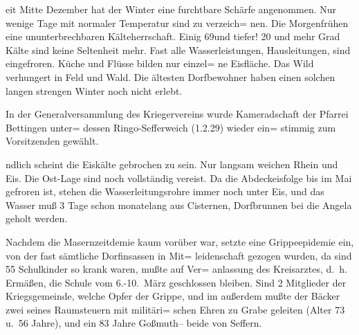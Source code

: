

%
eit Mitte Dezember hat der Winter eine\ob
furchtbare Schärfe angenommen. Nur wenige\ob
Tage mit normaler Temperatur sind zu verzeich=\ob
nen. Die Morgenfrühen eine ununterbrechbaren\ob
Kälteherrschaft. Einig 69\unsicher und tiefer! 20 und\ob
mehr Grad Kälte sind keine Seltenheit mehr.\ob
Fast alle Wasserleistungen, Hausleitungen, sind\ob
eingefroren. Küche und Flüsse bilden nur einzel=\ob
ne Eisfläche. Das Wild verhungert in Feld und Wald.\ob
Die ältesten Dorfbewohner haben einen solchen\ob
langen strengen Winter noch nicht erlebt.

In der Generalversammlung des Kriegervereins\ob
wurde Kameradschaft der Pfarrei Bettingen unter=\ob
dessen Ringo-Sefferweich (1.2.29) wieder ein=\ob
stimmig zum Vorsitzenden gewählt.

%
ndlich scheint die Eiskälte gebrochen\ob
zu sein. Nur langsam weichen Rhein und Eis.\ob
Die Ost-Lage sind noch vollständig vereist.\ob
Da die Abdeckeisfolge bis im Mai gefroren ist,\ob
stehen die Wasserleitungsrohre immer noch\ob
unter Eis, und das Wasser muß 3 Tage schon\ob
monatelang aus Cisternen, Dorfbrunnen\ob
bei die Angela geholt werden.

Nachdem die Masernzeitdemie kaum\ob
vorüber war, setzte eine Grippeepidemie ein,\ob
von der fast sämtliche Dorfinsassen in Mit=\ob
leidenschaft gezogen wurden, da sind 55%
Schulkinder so krank waren, mußte auf Ver=\ob
anlassung des Kreisarztes, d.\ h. Ermäßen, die\ob
Schule vom 6.-10.\ März geschlossen bleiben.\ob
Sind 2 Mitglieder der Kriegsgemeinde, welche\ob
Opfer der Grippe, und im außerdem mußte der\ob
Bäcker zwei seines Raumsteuern mit militäri=\ob
schen Ehren zu Grabe geleiten (Alter 73 u.\ 56 Jahre), und\ob
ein 83 Jahre Goßmuth\unsicher – beide von Seffern\unsicher.
\pend
